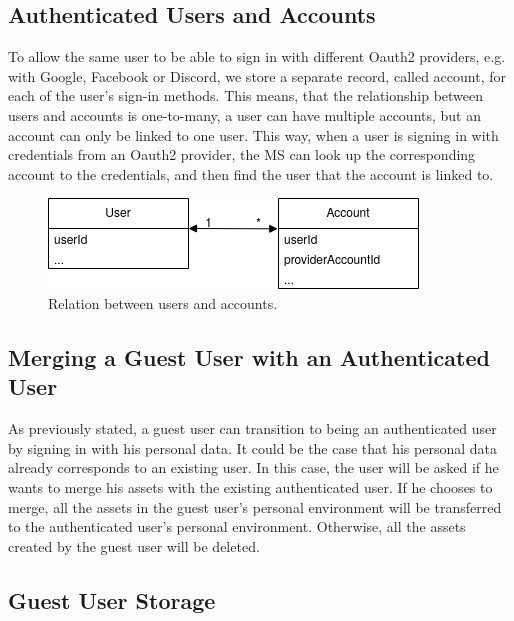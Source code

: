 \subsection{Authenticated Users and Accounts}

To allow the same user to be able to sign in with different Oauth2 providers, e.g. with Google,
Facebook or Discord, we store a separate record, called account, for each of the user's sign-in methods.
This means, that the relationship between users and accounts is one-to-many,
a user can have multiple accounts, but an account can only be linked to one user.
This way, when a user is signing in with credentials from an Oauth2 provider,
the MS can look up the corresponding account to the credentials, and then find the user
that the account is linked to.

\begin{figure}[H]
	\centering
	\includegraphics[scale=0.6]{images/users-accounts-relation.drawio.png}
	\caption{Relation between users and accounts.}
	\vspace{-1em} %
\end{figure}

\subsection{Merging a Guest User with an Authenticated User}
\label{cha:conceptanddesign:users:mergeguestuser}

As previously stated, a guest user can transition to being an authenticated user by
signing in with his personal data.
It could be the case that his personal data already corresponds to an existing user.
In this case, the user will be asked if he wants to merge his assets with the existing
authenticated user.
If he chooses to merge, all the assets in the guest user's personal environment will be
transferred to the authenticated user's personal environment.
Otherwise, all the assets created by the guest user will be deleted.

\subsection{Guest User Storage}

